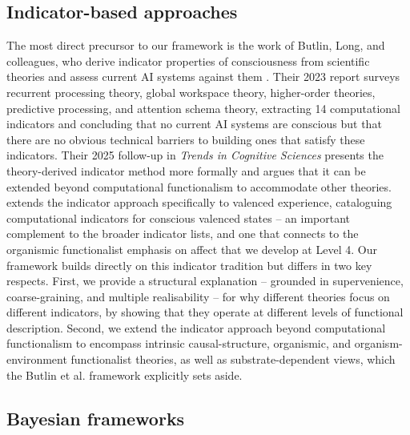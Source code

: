\documentclass[11pt, a4paper, onecolumn, gdm]{google}
\begin{document}
\subsection{Indicator-based approaches}\label{indicator-based-approaches}

The most direct precursor to our framework is the work of Butlin, Long, and colleagues, who derive indicator properties of consciousness from scientific theories and assess current AI systems against them \citep{butlin2023,butlin2025}.
Their 2023 report surveys recurrent processing theory, global workspace theory, higher-order theories, predictive processing, and attention schema theory, extracting 14 computational indicators and concluding that no current AI systems are conscious but that there are no obvious technical barriers to building ones that satisfy these indicators.
Their 2025 follow-up in \emph{Trends in Cognitive Sciences} presents the theory-derived indicator method more formally and argues that it can be extended beyond computational functionalism to accommodate other theories.
\citet{campero2024} extends the indicator approach specifically to valenced experience, cataloguing computational indicators for conscious valenced states -- an important complement to the broader indicator lists, and one that connects to the organismic functionalist emphasis on affect that we develop at Level 4.
Our framework builds directly on this indicator tradition but differs in two key respects.
First, we provide a structural explanation -- grounded in supervenience, coarse-graining, and multiple realisability -- for why different theories focus on different indicators, by showing that they operate at different levels of functional description.
Second, we extend the indicator approach beyond computational functionalism to encompass intrinsic causal-structure, organismic, and organism-environment functionalist theories, as well as substrate-dependent views, which the Butlin et al. framework explicitly sets aside.

\subsection{Bayesian frameworks}\label{bayesian-frameworks}
\end{document}
